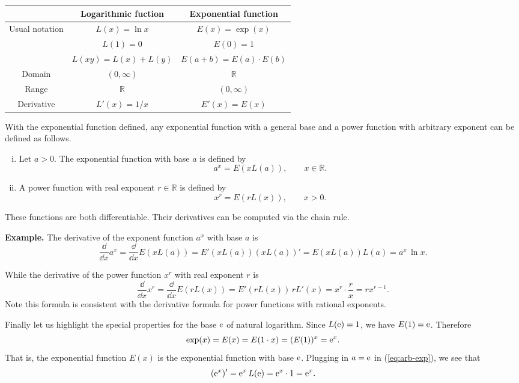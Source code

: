 \begin{center}
\begin{tabular}{c||c|c}
  & Logarithmic fuction & Exponential function \\ \hline
  Usual notation & $L(x) = \ln x$ & $E(x) = \exp(x)$ \\ \hline
  & $L(1) = 0$ & $E(0) = 1$ \\ \hline
  & $L(xy) = L(x) + L(y)$ & $E(a+b) = E(a) \cdot E(b)$ \\ \hline
  Domain & $(0,\infty)$ & $\mathbb{R}$ \\ \hline
  Range  & $\mathbb{R}$ & $(0,\infty)$ \\ \hline
  Derivative & $L'(x) = 1/x$ & $E'(x) = E(x)$
\end{tabular}
\end{center}

With the exponential function defined, any exponential function with a general base and a power function with arbitrary exponent can be defined as follows.

\begin{defn}
  \begin{enumerate}[(i)]
    \item Let $a > 0$.  The exponential function with base $a$ is defined by
      \[
	a^x = E(x L(a)), \qquad x \in \mathbb{R}.
      \]

    \item A power function with real exponent $r \in \mathbb{R}$ is defined by
      \[
	x^r = E(r L(x)), \qquad x > 0.
      \]
  \end{enumerate}
\end{defn}

These functions are both differentiable.
Their derivatives can be computed via the chain rule.

\medskip
\noindent\textbf{Example.} The derivative of the exponent function $a^x$ with base $a$ is
\begin{equation}
  \label{eq:arb-exp}
  \frac{\dd}{\dd x} a^x = \frac{\dd}{\dd x} E(x L(a)) = E'(x L(a)) (x L(a))' = E(x L(a)) L(a) = a^x \, \ln x.
\end{equation}

While the derivative of the power function $x^r$ with real exponent $r$ is
\[
  \frac{\dd}{\dd x} x^r = \frac{\dd}{\dd x} E(r L(x)) = E'(r L(x)) \, r L'(x) = x^r \cdot \frac{r}{x} = r x^{r-1}.
\]
Note this formula is consistent with the derivative formula for power functions with rational exponents.

\medskip
Finally let us highlight the special properties for the base $\mathrm e$ of natural logarithm.  Since $L(\mathrm e) = 1$, we have $E(1) = \mathrm e$.  Therefore
\[
  \exp(x) = E(x) = E(1 \cdot x) = (E(1))^x = \mathrm e^x.
\] 
That is, the exponential function $E(x)$ is the exponential function with base $\mathrm e$.  Plugging in $a = \mathrm e$ in (\ref{eq:arb-exp}), we see that
\[
  (\mathrm e^x)' = \mathrm e^x \, L(\mathrm e) = \mathrm e^x \cdot 1 = \mathrm e^x.
\]


